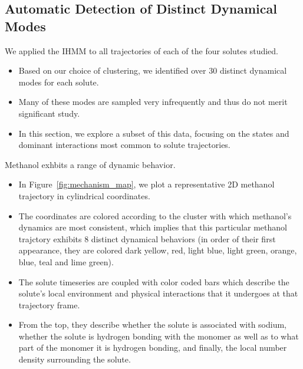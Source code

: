 \documentclass{article}
\begin{document}
  \subsection{Automatic Detection of Distinct Dynamical Modes}\label{section:find_modes}
  
  
  We applied the IHMM to all trajectories of each of the four solutes studied.
  \begin{itemize}
    \item Based on our choice of clustering, we identified over 30 distinct dynamical
    modes for each solute.
    \item Many of these modes are sampled very infrequently and thus do not merit significant study.
    \item In this section, we explore a subset of this data, focusing on the states
    and dominant interactions most common to solute trajectories. 
  \end{itemize}  
  
  \noindent Methanol exhbits a range of dynamic behavior.
  \begin{itemize}
    \item In Figure~\ref{fig:mechanism_map}, we plot a representative 2D methanol 
    trajectory in cylindrical coordinates.
    \item The coordinates are colored according to the cluster with which methanol's
    dynamics are most consistent, which implies that this particular methanol 
    trajctory exhibits 8 distinct dynamical behaviors (in order of their first appearance,
    they are colored dark yellow, red, light blue, light green, orange, blue, teal and lime green). 
    \item The solute timeseries are coupled with color coded bars which describe the
    solute's local environment and physical interactions that it undergoes at that
    trajectory frame.
    \item From the top, they describe whether the solute is associated with sodium,
    whether the solute is hydrogen bonding with the monomer as well as to what part of
    the monomer it is hydrogen bonding, and finally, the local number density 
    surrounding the solute. 
  \end{itemize}
  
\end{document}
